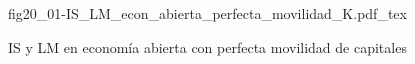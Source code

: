 \begin{figure}[h]
\centering
\def\svgwidth{0.9\textwidth}
{fig20_01-IS_LM_econ_abierta_perfecta_movilidad_K.pdf_tex}
\caption{IS y LM en economía abierta con perfecta movilidad de capitales}
\label{fig20_01-IS_LM_econ_abierta_perfecta_movilidad_K}
\end{figure}